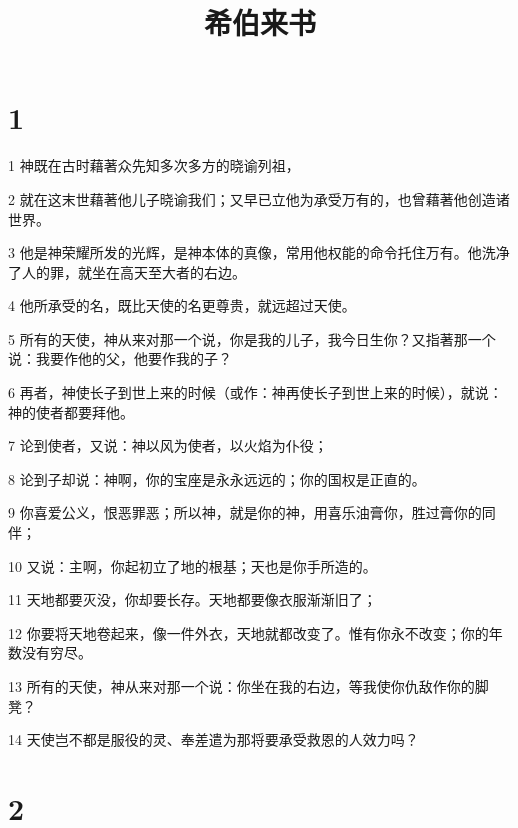 

\title{希伯来书}


\chapter{1}

\par 1 神既在古时藉著众先知多次多方的晓谕列祖，
\par 2 就在这末世藉著他儿子晓谕我们；又早已立他为承受万有的，也曾藉著他创造诸世界。
\par 3 他是神荣耀所发的光辉，是神本体的真像，常用他权能的命令托住万有。他洗净了人的罪，就坐在高天至大者的右边。
\par 4 他所承受的名，既比天使的名更尊贵，就远超过天使。
\par 5 所有的天使，神从来对那一个说，你是我的儿子，我今日生你？又指著那一个说：我要作他的父，他要作我的子？
\par 6 再者，神使长子到世上来的时候（或作：神再使长子到世上来的时候），就说：神的使者都要拜他。
\par 7 论到使者，又说：神以风为使者，以火焰为仆役；
\par 8 论到子却说：神啊，你的宝座是永永远远的；你的国权是正直的。
\par 9 你喜爱公义，恨恶罪恶；所以神，就是你的神，用喜乐油膏你，胜过膏你的同伴；
\par 10 又说：主啊，你起初立了地的根基；天也是你手所造的。
\par 11 天地都要灭没，你却要长存。天地都要像衣服渐渐旧了；
\par 12 你要将天地卷起来，像一件外衣，天地就都改变了。惟有你永不改变；你的年数没有穷尽。
\par 13 所有的天使，神从来对那一个说：你坐在我的右边，等我使你仇敌作你的脚凳？
\par 14 天使岂不都是服役的灵、奉差遣为那将要承受救恩的人效力吗？

\chapter{2}

